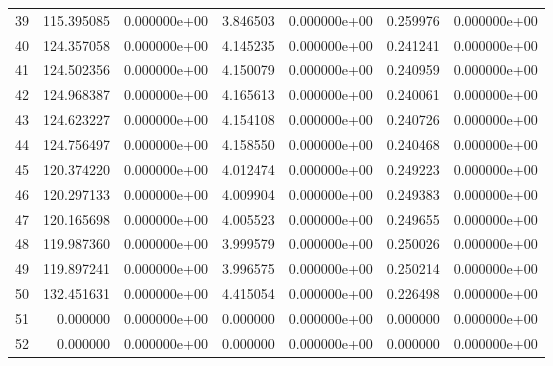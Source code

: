 \begin{tabular}{rrrrrrr}
39 & 115.395085 &  0.000000e+00 &  3.846503 &  0.000000e+00 &    0.259976 &  0.000000e+00 \\
40 & 124.357058 &  0.000000e+00 &  4.145235 &  0.000000e+00 &    0.241241 &  0.000000e+00 \\
41 & 124.502356 &  0.000000e+00 &  4.150079 &  0.000000e+00 &    0.240959 &  0.000000e+00 \\
42 & 124.968387 &  0.000000e+00 &  4.165613 &  0.000000e+00 &    0.240061 &  0.000000e+00 \\
43 & 124.623227 &  0.000000e+00 &  4.154108 &  0.000000e+00 &    0.240726 &  0.000000e+00 \\
44 & 124.756497 &  0.000000e+00 &  4.158550 &  0.000000e+00 &    0.240468 &  0.000000e+00 \\
45 & 120.374220 &  0.000000e+00 &  4.012474 &  0.000000e+00 &    0.249223 &  0.000000e+00 \\
46 & 120.297133 &  0.000000e+00 &  4.009904 &  0.000000e+00 &    0.249383 &  0.000000e+00 \\
47 & 120.165698 &  0.000000e+00 &  4.005523 &  0.000000e+00 &    0.249655 &  0.000000e+00 \\
48 & 119.987360 &  0.000000e+00 &  3.999579 &  0.000000e+00 &    0.250026 &  0.000000e+00 \\
49 & 119.897241 &  0.000000e+00 &  3.996575 &  0.000000e+00 &    0.250214 &  0.000000e+00 \\
50 & 132.451631 &  0.000000e+00 &  4.415054 &  0.000000e+00 &    0.226498 &  0.000000e+00 \\
51 &   0.000000 &  0.000000e+00 &  0.000000 &  0.000000e+00 &    0.000000 &  0.000000e+00 \\
52 &   0.000000 &  0.000000e+00 &  0.000000 &  0.000000e+00 &    0.000000 &  0.000000e+00 \\
\bottomrule
\end{tabular}
